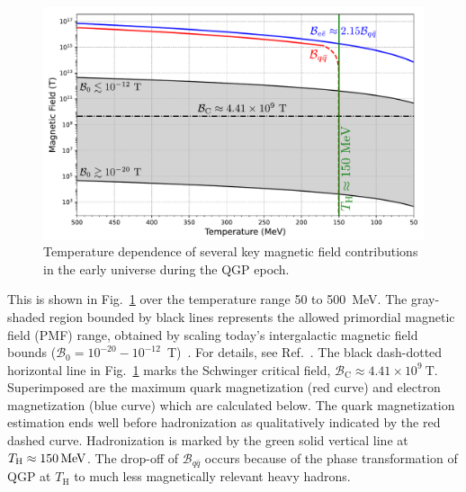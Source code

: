 \documentclass[epjST]{svjour}
\newcommand*{\MeV}{\text{\,MeV}}
\begin{document}
\begin{figure}%
\centerline{
\includegraphics[width=0.90\columnwidth]{Figure_1_v2.pdf}}
\caption{\label{Figure_1}Temperature dependence of several key magnetic field contributions in the early universe during the QGP epoch.}
\end{figure}

This is shown in Fig.~\ref{Figure_1} over the temperature range 50 to 500~MeV. The gray-shaded region bounded by black lines represents the allowed primordial magnetic field (PMF) range, obtained by scaling today’s intergalactic magnetic field bounds (\(\mathcal{B}_{0} = 10^{-20}-10^{-12}\)~T)~\cite{Planck:2015zrl,Jedamzik:2018itu}. For details, see Ref.~\cite{Steinmetz:2023nsc}. The black dash-dotted horizontal line in Fig.~\ref{Figure_1} marks the Schwinger critical field, \(\mathcal{B}_\mathrm{C}\approx4.41\times10^{9}~\mathrm{T}\). Superimposed are the maximum quark magnetization (red curve) and electron magnetization (blue curve) which are calculated below. The quark magnetization estimation ends well before hadronization as qualitatively indicated by the red dashed curve. Hadronization is marked by the green solid vertical line at \(T_\mathrm{H}\approx150\MeV\). The drop-off of \(\mathcal{B}_{q\bar{q}}\) occurs because of the phase transformation of QGP at \(T_\mathrm{H}\) to much less magnetically relevant heavy hadrons.
\end{document}
